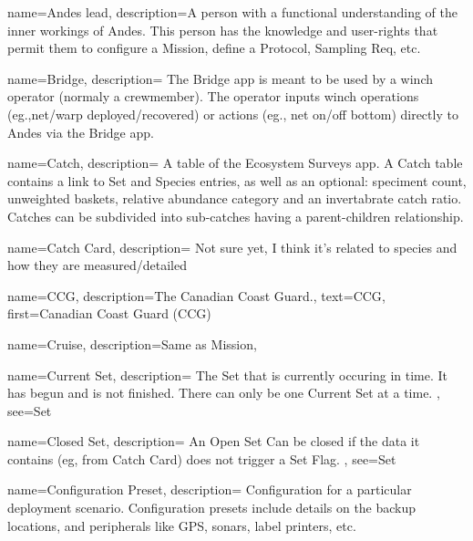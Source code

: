 \usepackage[nonumberlist,acronym,numberedsection]{glossaries}

\makenoidxglossaries

 {
  name=Andes lead,
  description={A person with a functional understanding of the inner workings of Andes.
   This person has the knowledge and user-rights that permit them to configure a \gls{Mission}, define a \gls{Protocol}, \gls{Sampling Req}, etc.}
}

 {
  name=Bridge,
  description={
    The Bridge app is meant to be used by a winch operator (normaly a crewmember).
    The operator inputs winch operations (eg.,net/warp deployed/recovered) or actions (eg., net on/off bottom) directly to Andes via the Bridge app.
  }
}

 {
  name=Catch,
  description={
    A table of the Ecosystem Surveys app. A Catch table contains a link to \gls{Set} and \gls{Species} entries, as well as an optional: speciment count, unweighted baskets, relative abundance category and an invertabrate catch ratio.
    Catches can be subdivided into sub-catches having a parent-children relationship.
  }
}

 {
  name=Catch Card,
  description={
    Not sure yet, I think it's related to species and how they are measured/detailed
  }
}

 {
  name=CCG,
  description={The Canadian Coast Guard.},
  text={CCG},
  first={Canadian Coast Guard (CCG)}
}

 {
  name=Cruise,
  description={Same as \gls{Mission}},
}

 {
  name=Current Set,
  description={
    The \gls{Set} that is currently occuring in time.
    It has begun and is not finished.
    There can only be one \gls{Current Set} at a time.
  },
  see={Set}
}

 {
  name=Closed Set,
  description={
    An \gls{Open Set} Can be closed if the data it contains (eg, from \gls{Catch Card}) does not trigger a \gls{Set Flag}.
  },
  see={Set}
}

  {
  name=Configuration Preset,
  description={
    Configuration for a particular deployment scenario. Configuration presets include details on the backup locations, and peripherals like GPS, sonars, label printers, etc.
  }
}

